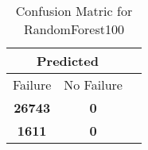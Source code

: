 \begin{table}[] 
\caption{Confusion Matric for RandomForest100} 
\label{Table: Prediction Accuracy-NoneRandomForest10090.0EKF-ignoreReflection-Reflection} 
\centering 
\begin{tabular} 
 {@{}ccc@{}} 
\toprule 
\multicolumn{2}{c}{\textbf{Predicted}}
 \\ \midrule 
\multicolumn{1}{|c|}{Failure} & 
\multicolumn{1}{c|}{No Failure}
 \\ \midrule 
\multicolumn{1}{|c|}{\color{green}\textbf{26743}} & 
\multicolumn{1}{c|}{\color{green}\textbf{0}}
 \\ \midrule 
\multicolumn{1}{|c|}{\color{red}\textbf{1611}} & 
\multicolumn{1}{c|}{\color{green}\textbf{0}}
 \\ \bottomrule 
\end{tabular} 
\end{table} 
